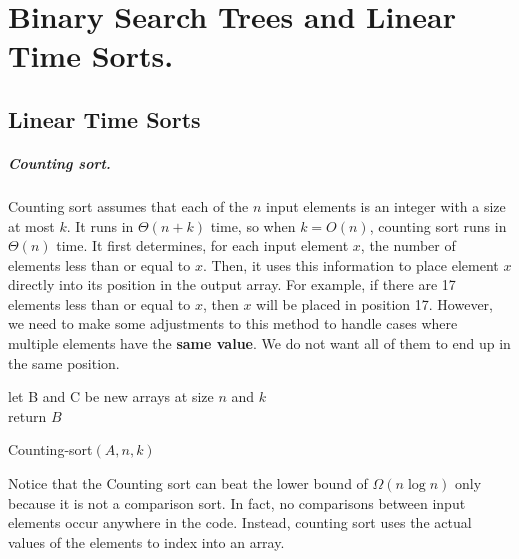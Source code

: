 


\ifdefined\BOOK
\else
\setcounter{chapter}{5}
\fi
\chapter{Binary Search Trees and Linear Time Sorts.} 

\section{Linear Time Sorts}
\paragraph{ Counting sort.}
Counting sort assumes that each of the $n$ input elements is an integer with a size at most $k$. It runs in $\Theta(n + k)$ time, so when $k = O(n)$, counting sort runs in $\Theta(n)$ time. It first determines, for each input element $x$, the number of elements less than or equal to $x$. Then, it uses this information to place element $x$ directly into its position in the output array. For example, if there are 17 elements less than or equal to $x$, then $x$ will be placed in position 17. However, we need to make some adjustments to this method to handle cases where multiple elements have the \textbf{same value}. We do not want all of them to end up in the same position.

  \begin{algorithm}
  	let B and C be new arrays at size $n$ and $k$ \\ 
	  return $B$
\caption{Counting-sort$(A, n, k)$}
  \end{algorithm}

Notice that the Counting sort can beat the lower bound of $\Omega\left(n \log n\right)$ only because it is not a comparison sort. In fact, no comparisons between input elements occur anywhere in the code. Instead, counting sort uses the actual values of the elements to index into an array.


